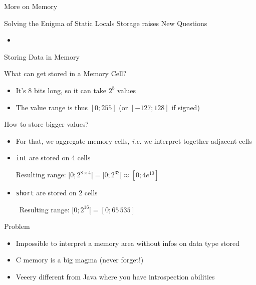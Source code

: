 \begin{Coupe}
\begin{frame}{More on Memory}
\begin{block}{Solving the Enigma of Static Locals Storage raises New Questions}
\begin{itemize}
\begin{itemize}
      \item<6-> 
      \end{itemize}
    \end{itemize}
  \end{block}
\end{frame}
\begin{frame}{Storing Data in Memory}
  \begin{block}{What can get stored in a Memory Cell?}
    \begin{itemize}
    \item It's 8 bits long, so it can take $2^8$ values
    \item The value range is thus $[0;255]$ (or $[-127;128]$ if signed)
    \end{itemize}
  \end{block}
  \begin{block}{How to store bigger values?}
    \begin{itemize}
    \item For that, we aggregate memory cells, \textit{i.e.} we interpret
      together adjacent cells
    \item \texttt{int} are stored on 4 cells
      Resulting range: $[0;2^{8\times 4}[=[0;2^{32}[\approx[0;4e^{10}]$
    \item \texttt{short} are stored on 2 cells
      ~Resulting range: $[0;2^{16}[=[0;65\,535]$
    \end{itemize}
  \end{block}

  \begin{block}{\alert{Problem}}
    \begin{itemize}
    \item \alert{Impossible to interpret a memory area without infos on data type stored}
    \item {} C memory is a big magma (never forget!)
    \item Veeery different from Java where you have introspection abilities
    \end{itemize}
  \end{block}
\end{frame}

\end{Coupe}
